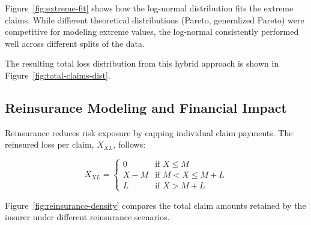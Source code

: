 \documentclass[8pt]{article}
\begin{document}

Figure~\ref{fig:extreme-fit} shows how the log-normal distribution fits the extreme claims. While different theoretical distributions (Pareto, generalized Pareto) were competitive for modeling extreme values, the log-normal consistently performed well across different splits of the data.

The resulting total loss distribution from this hybrid approach is shown in Figure~\ref{fig:total-claims-dist}.


\subsection{Reinsurance Modeling and Financial Impact}
Reinsurance reduces risk exposure by capping individual claim payments. The reinsured loss per claim, $X_{XL}$, follows:

\[
X_{XL} =
\begin{cases}
0 & \text{if } X \leq M \\
X - M & \text{if } M < X \leq M + L \\
L & \text{if } X > M + L
\end{cases}
\]

Figure~\ref{fig:reinsurance-density} compares the total claim amounts retained by the insurer under different reinsurance scenarios.
\end{document}
